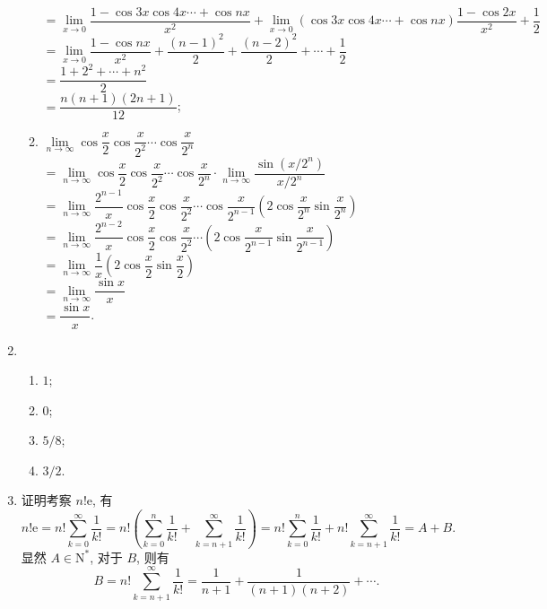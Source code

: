 \begin{enumerate}
\begin{enumerate}[(1)]
                $= \lim\limits_{x\to0} \dfrac{1 - \cos 3x\cos 4x\cdots + \cos nx}{x^2} + \lim\limits_{x\to0} (\cos 3x\cos 4x\cdots + \cos nx) \dfrac{1 - \cos2x}{x^2} + \dfrac12$ \\
                $= \lim\limits_{x\to0} \dfrac{1 - \cos nx}{x^2} + \dfrac{(n-1)^2}{2} + \dfrac{(n-2)^2}{2} + \cdots + \dfrac12$ \\
                $= \dfrac{1 + 2^2 + \cdots + n^2}{2}$ \\
                $= \dfrac{n(n+1)(2n+1)}{12}$;
            \item %
                $\lim\limits_{n\to\infty}\cos\dfrac{x}{2}\cos\dfrac{x}{2^2}\cdots\cos\dfrac{x}{2^n}$ \\
                $= \lim\limits_{n\to\infty}\cos\dfrac{x}{2}\cos\dfrac{x}{2^2}\cdots\cos\dfrac{x}{2^n} \cdot \lim\limits_{n\to\infty} \dfrac{\sin(x/2^n)}{x/2^n}$ \\
                $= \lim\limits_{n\to\infty} \dfrac{2^{n-1}}{x} \cos\dfrac{x}{2} \cos\dfrac{x}{2^2} \cdots \cos\dfrac{x}{2^{n-1}}\left(2\cos\dfrac{x}{2^n}\sin\dfrac{x}{2^n}\right)$ \\
                $= \lim\limits_{n\to\infty} \dfrac{2^{n-2}}{x} \cos\dfrac{x}{2} \cos\dfrac{x}{2^2} \cdots \left(2\cos\dfrac{x}{2^{n-1}}\sin\dfrac{x}{2^{n-1}}\right)$ \\
                $= \lim\limits_{n\to\infty} \dfrac1x\left(2\cos\dfrac{x}{2}\sin\dfrac{x}{2}\right)$ \\
                $= \lim\limits_{n\to\infty} \dfrac{\sin x}{x}$ \\
                $= \dfrac{\sin x}{x}$.
        \end{enumerate}
    \item %
        \begin{enumerate}[(1)]
            \item %
                $1$;
            \item %
                $0$;
            \item %
                $5/8$;
            \item %
                $3/2$.
        \end{enumerate}
    \item %
        {\heiti 证明}\quad 考察 $n!\mathrm{e}$, 有
        \[
            n!\mathrm{e} = n! \sum_{k=0}^\infty\frac{1}{k!} = n!\left(\sum_{k=0}^n\frac{1}{k!} + \sum_{k=n+1}^\infty\frac{1}{k!}\right) = n! \sum_{k=0}^n\frac{1}{k!} + n!\sum_{k=n+1}^\infty\frac{1}{k!} = A + B.
        \]
        显然 $A \in \mathrm{N}^*$, 对于 $B$, 则有
        \[
            B = n!\sum_{k=n+1}^\infty\frac{1}{k!} = \frac{1}{n+1} + \frac{1}{(n+1)(n+2)} + \cdots.    
        \]
        

\end{enumerate}
